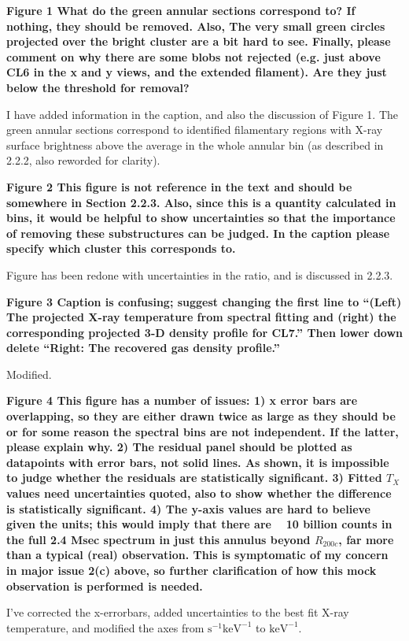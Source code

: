 \documentclass{article}
\begin{document}
{\bf 
Figure 1
What do the green annular sections correspond to? If nothing, they should
be removed. Also, The very small green circles projected over the bright
cluster are a bit hard to see. Finally, please comment on why there are
some blobs not rejected (e.g. just above CL6 in the x and y views, and the
extended filament). Are they just below the threshold for removal?
}

I have added information in the caption, and also the discussion of
Figure 1.  The green annular sections correspond to identified
filamentary regions with X-ray surface brightness above the average in
the whole annular bin (as described in 2.2.2, also reworded for clarity).


{\bf 
Figure 2
This figure is not reference in the text and should be somewhere in Section
2.2.3. Also, since this is a quantity calculated in bins, it would be
helpful to show uncertainties so that the importance of removing these
substructures can be judged. In the caption please specify which cluster
this corresponds to.
}

Figure has been redone with uncertainties in the ratio, and is
discussed in 2.2.3.

{\bf 
Figure 3
Caption is confusing; suggest changing the first line to ``(Left) The
projected X-ray temperature from spectral fitting and (right) the
corresponding projected 3-D density profile for CL7.'' Then lower down delete
``Right: The recovered gas density profile.''
}

Modified.

{\bf 
Figure 4
This figure has a number of issues:
1) x error bars are overlapping, so they are either drawn twice as large as
they should be or for some reason the spectral bins are not independent.
If the latter, please explain why.
2) The residual panel should be plotted as datapoints with error bars, not
solid lines. As shown, it is impossible to judge whether the residuals are
statistically significant.
3) Fitted $T_X$ values need uncertainties quoted, also to show whether the
difference is statistically significant.
4) The y-axis values are hard to believe given the units; this would imply
that there are ~ 10 billion counts in the full 2.4 Msec spectrum in just this
annulus beyond $R_{200c}$, far more than a typical (real) observation. This
is symptomatic of my concern in major issue 2(c) above, so further
clarification of how this mock observation is performed is needed.
}

I've corrected the x-errorbars, added uncertainties to the best fit
X-ray temperature, and modified the axes from $\mathrm{s^{-1}keV^{-1}}$ to
$\mathrm{keV^{-1}}$.  
\end{document}
